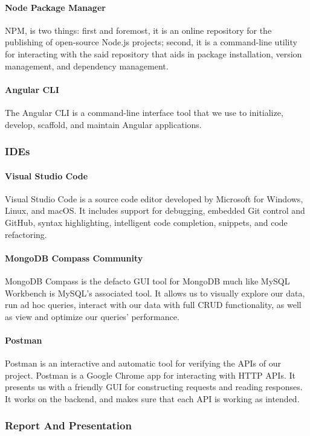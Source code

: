 \paragraph*{Node Package Manager}
\ac{NPM}, is two things: first and foremost, it is an online repository for the publishing of open-source Node.js projects; second, it is a command-line utility for interacting with the said repository that aids in package installation, version management, and dependency management.
\paragraph*{Angular CLI}
The Angular CLI is a command-line interface tool that we use to initialize, develop, scaffold, and maintain Angular applications. 
\subsubsection{IDEs}

\paragraph*{Visual Studio Code}
Visual Studio Code is a source code editor developed by Microsoft for Windows, Linux, and macOS. It includes support for debugging, embedded Git control and GitHub, syntax highlighting, intelligent code completion, snippets, and code refactoring.


\paragraph*{MongoDB Compass Community}
MongoDB Compass is the defacto GUI tool for MongoDB much like MySQL Workbench is MySQL’s associated tool. It allows us to visually explore our data, run ad hoc queries, interact with our data with full CRUD functionality, as well as view and optimize our queries’ performance.


\paragraph*{Postman}
Postman is an interactive and automatic tool for verifying the APIs of our project. Postman is a Google Chrome app for interacting with HTTP APIs. It presents us with a friendly GUI for constructing requests and reading responses. It works on the backend, and makes sure that each API is working as intended.




\subsubsection{Report And Presentation}
